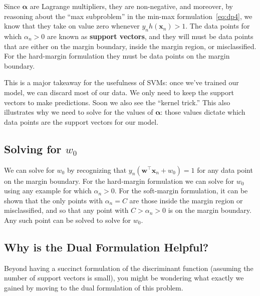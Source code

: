 Since $\boldsymbol{\alpha}$ are Lagrange multipliers, they are non-negative, and moreover, by reasoning about the ``max subproblem''
      in the min-max formulation~\eqref{eq:dp4}, we know that they take on value zero whenever $y_{n}
      h(\textbf{x}_{n}) > 1$.
%
%
      The data points for which $\alpha_{n} > 0$ are known as \textbf{support vectors}, and
they will  must be data points that are either  on the margin boundary, inside the margin region, or misclassified. For the hard-margin formulation they must be data points on the margin boundary.

This is a major takeaway for the usefulness of SVMs: once we've trained our model, we can discard most of our data. We only need to keep the support vectors to make predictions. Soon we also see the ``kernel trick.'' This also illustrates why we need to solve for the values of $\boldsymbol{\alpha}$: those values dictate which data points are the support vectors for our model.


\subsection*{Solving for $w_0$}

We can solve for $w_0$ by recognizing that $y_n({\mathbf w}^\top {\mathbf x}_n+w_0)=1$ for any data point on the margin boundary. For the hard-margin formulation we can solve for $w_0$ using any example for which $\alpha_n>0$. For the soft-margin formulation, it can be shown that the only points with $\alpha_n=C$ are those inside the margin region or misclassified, and so that any point with $C>\alpha_n>0$ is on the margin boundary. Any such point can be solved to solve for $w_0$.


\subsection{Why is the Dual Formulation Helpful?}

Beyond having a succinct formulation of the discriminant function (assuming the number of support vectors is small), you might be wondering what exactly we gained by moving to the dual formulation of this problem.

